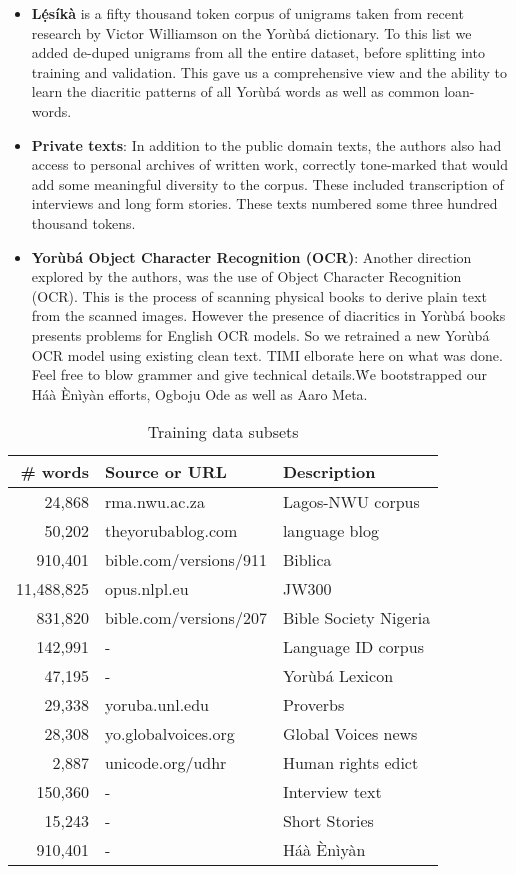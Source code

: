 \documentclass{article} %
\begin{document}
\begin{itemize}
\item \textbf{L\d{\'e}s{\'i}k{\`a}} is a fifty thousand token corpus of unigrams taken from recent research by Victor Williamson on the Yor{\`u}b{\'a} dictionary. To this list we added de-duped unigrams from all the entire dataset, before splitting into training and validation. This gave us a comprehensive view and the ability to learn the diacritic patterns of all Yor{\`u}b{\'a} words as well as common loan-words.

\item \textbf{Private texts}: In addition to the public domain texts, the authors also had access to personal archives of written work, correctly tone-marked that would add some meaningful diversity to the corpus. These included transcription of interviews and long form stories. These texts numbered some three hundred thousand tokens.

\item \textbf{{Yor{\`u}b{\'a} Object Character Recognition (OCR)}}: Another direction explored by the authors, was the use of Object Character Recognition (OCR).  This is the process of scanning physical books to derive plain text from the scanned images. However the presence of diacritics in Yor{\`u}b{\'a} books presents problems for English OCR models. So we retrained a new Yor{\`u}b{\'a} OCR model using existing clean text. TIMI elborate here on what was done. Feel free to blow grammer and give technical details.\. We bootstrapped our Háà Ènìyàn efforts, Ogboju Ode as well as Aaro Meta.
\end{itemize}

 \begin{table}[h]
  \caption{Training data subsets}
  \label{tab:training_datasets}
  \centering
  \begin{tabular}{rll}
    \toprule
    \textbf{\# words} & \textbf{Source or URL}  & \textbf{Description} \\
    \midrule
    24,868 & rma.nwu.ac.za  & Lagos-NWU corpus \\  
    50,202 & theyorubablog.com & language blog\\  
    910,401 & bible.com/versions/911 & Biblica \\
    \midrule
    11,488,825 & opus.nlpl.eu & JW300 \\
    831,820 & bible.com/versions/207 & Bible Society Nigeria \\
    142,991 & - & Language ID corpus \\
    47,195 & - & Yor{\`u}b{\'a} Lexicon \\
    29,338 & yoruba.unl.edu & Proverbs \\
    28,308 & yo.globalvoices.org & Global Voices news \\
    2,887 & unicode.org/udhr & Human rights edict \\

    \midrule
    150,360 & - & Interview text \\
    15,243 & - & Short Stories \\
    910,401 & - & Háà Ènìyàn \\

    \bottomrule
  \end{tabular}
\end{table}
\end{document}
